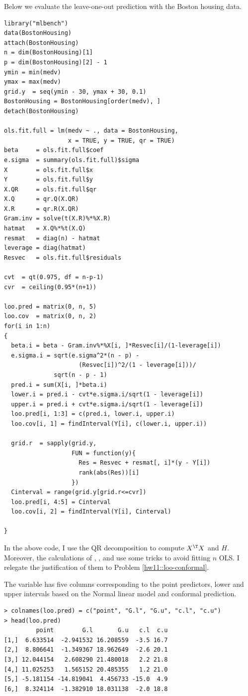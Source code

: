 Below we evaluate the leave-one-out prediction with the Boston housing data. 
\begin{lstlisting}
library("mlbench")
data(BostonHousing)
attach(BostonHousing)
n = dim(BostonHousing)[1]
p = dim(BostonHousing)[2] - 1
ymin = min(medv)
ymax = max(medv)
grid.y  = seq(ymin - 30, ymax + 30, 0.1)
BostonHousing = BostonHousing[order(medv), ]
detach(BostonHousing)

ols.fit.full = lm(medv ~ ., data = BostonHousing,
                  x = TRUE, y = TRUE, qr = TRUE)
beta     = ols.fit.full$coef
e.sigma  = summary(ols.fit.full)$sigma
X        = ols.fit.full$x
Y        = ols.fit.full$y
X.QR     = ols.fit.full$qr
X.Q      = qr.Q(X.QR)
X.R      = qr.R(X.QR)
Gram.inv = solve(t(X.R)%*%X.R)
hatmat   = X.Q%*%t(X.Q) 
resmat   = diag(n) - hatmat
leverage = diag(hatmat)
Resvec   = ols.fit.full$residuals

cvt  = qt(0.975, df = n-p-1)
cvr  = ceiling(0.95*(n+1))

loo.pred = matrix(0, n, 5)
loo.cov  = matrix(0, n, 2)
for(i in 1:n)
{
  beta.i = beta - Gram.inv%*%X[i, ]*Resvec[i]/(1-leverage[i])
  e.sigma.i = sqrt(e.sigma^2*(n - p) - 
                     (Resvec[i])^2/(1 - leverage[i]))/
              sqrt(n - p - 1)
  pred.i = sum(X[i, ]*beta.i) 
  lower.i = pred.i - cvt*e.sigma.i/sqrt(1 - leverage[i])
  upper.i = pred.i + cvt*e.sigma.i/sqrt(1 - leverage[i])
  loo.pred[i, 1:3] = c(pred.i, lower.i, upper.i)
  loo.cov[i, 1] = findInterval(Y[i], c(lower.i, upper.i))
  
  grid.r  = sapply(grid.y,
                   FUN = function(y){
                     Res = Resvec + resmat[, i]*(y - Y[i]) 
                     rank(abs(Res))[i]
                   })
  Cinterval = range(grid.y[grid.r<=cvr])
  loo.pred[i, 4:5] = Cinterval
  loo.cov[i, 2] = findInterval(Y[i], Cinterval)
  
}
\end{lstlisting}

In the above code, I use the QR decomposition to compute $X^{\T} X$ and $H$. Moreover, the calculations of , , and  use some tricks to avoid fitting $n$ OLS. I relegate the justification of them to Problem \ref{hw11::loo-conformal}. 

The variable  has five columns corresponding to the point predictors, lower and upper intervals based on the Normal linear model and conformal prediction. 
\begin{lstlisting}
> colnames(loo.pred) = c("point", "G.l", "G.u", "c.l", "c.u")
> head(loo.pred)
         point        G.l       G.u   c.l  c.u
[1,]  6.633514  -2.941532 16.208559  -3.5 16.7
[2,]  8.806641  -1.349367 18.962649  -2.6 20.1
[3,] 12.044154   2.608290 21.480018   2.2 21.8
[4,] 11.025253   1.565152 20.485355   1.2 21.0
[5,] -5.181154 -14.819041  4.456733 -15.0  4.9
[6,]  8.324114  -1.382910 18.031138  -2.0 18.8
\end{lstlisting}

